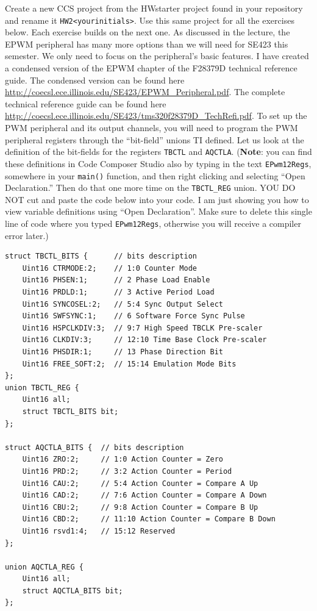 \documentclass[11pt]{article}
\begin{document}
Create a new CCS project from the HWstarter project found in your repository and rename it \lstinline|HW2<yourinitials>|. Use this same project for all the exercises below. Each exercise builds on the next one.
As discussed in the lecture, the EPWM peripheral has many more options than we will need for SE423 this semester. We only need to focus on the peripheral's basic features. I have created a condensed version of the EPWM chapter of the F28379D technical reference guide. The condensed version can be found here \url{http://coecsl.ece.illinois.edu/SE423/EPWM_Peripheral.pdf}. The complete technical reference guide can be found here \url{http://coecsl.ece.illinois.edu/SE423/tms320f28379D_TechRefi.pdf}.
To set up the PWM peripheral and its output channels, you will need to program the PWM peripheral registers through the “bit-field” unions TI defined. Let us look at the definition of the bit-fields for the registers \texttt{TBCTL} and \texttt{AQCTLA}.  (\textbf{Note}: you can find these definitions in Code Composer Studio also by typing in the text \texttt{EPwm12Regs}, somewhere in your \lstinline|main()| function, and then right clicking and selecting “Open Declaration.”  Then do that one more time on the \lstinline|TBCTL_REG| union. YOU DO NOT cut and paste the code below into your code. I am just showing you how to view variable definitions using “Open Declaration”. Make sure to delete this single line of code where you typed \texttt{EPwm12Regs}, otherwise you will receive a compiler error later.)
%
\begin{verbatim}
struct TBCTL_BITS {      // bits description
    Uint16 CTRMODE:2;    // 1:0 Counter Mode
    Uint16 PHSEN:1;      // 2 Phase Load Enable
    Uint16 PRDLD:1;      // 3 Active Period Load
    Uint16 SYNCOSEL:2;   // 5:4 Sync Output Select
    Uint16 SWFSYNC:1;    // 6 Software Force Sync Pulse
    Uint16 HSPCLKDIV:3;  // 9:7 High Speed TBCLK Pre-scaler
    Uint16 CLKDIV:3;     // 12:10 Time Base Clock Pre-scaler
    Uint16 PHSDIR:1;     // 13 Phase Direction Bit
    Uint16 FREE_SOFT:2;  // 15:14 Emulation Mode Bits
};
union TBCTL_REG {
    Uint16 all;
    struct TBCTL_BITS bit;
};

struct AQCTLA_BITS {  // bits description
    Uint16 ZRO:2;     // 1:0 Action Counter = Zero
    Uint16 PRD:2;     // 3:2 Action Counter = Period
    Uint16 CAU:2;     // 5:4 Action Counter = Compare A Up
    Uint16 CAD:2;     // 7:6 Action Counter = Compare A Down
    Uint16 CBU:2;     // 9:8 Action Counter = Compare B Up
    Uint16 CBD:2;     // 11:10 Action Counter = Compare B Down
    Uint16 rsvd1:4;   // 15:12 Reserved
};

union AQCTLA_REG {
    Uint16 all;
    struct AQCTLA_BITS bit;
};
\end{verbatim}
\end{document}
